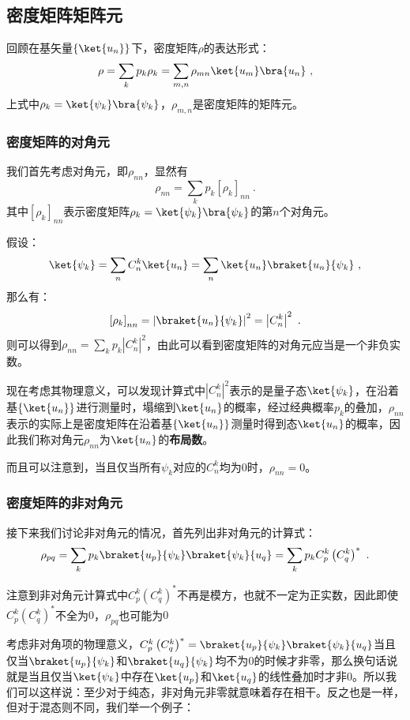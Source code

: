 \subsection{密度矩阵矩阵元}


回顾在基矢量$\left\{ \ket{u_n}\right\}$下，密度矩阵$\rho$的表达形式：
$$\rho = \sum\limits_k p_k\rho_k = \sum\limits_{m,n}\rho_{mn}\ket{u_m}\bra{u_n} ~,$$
上式中$\rho_k = \ket{\psi_k}\bra{\psi_k}$，$\rho_{m,n}$是密度矩阵的矩阵元。

\subsubsection{密度矩阵的对角元}

我们首先考虑对角元，即$\rho_{nn}$，显然有
$$\rho_{nn} = \sum\limits_{k} p_k \left[\rho_k\right]_{nn}~.$$
其中$\left[\rho_k\right]_{nn}$表示密度矩阵$\rho_k = \ket{\psi_k}\bra{\psi_k}$的第$n$个对角元。

假设：
$$\ket{\psi_k} = \sum\limits_n C_n^{k}\ket{u_n} = \sum\limits_n\ket{u_n}\braket{u_n}{\psi_k}~,$$
那么有：
$$\left[\rho_k\right]_{nn} = \left|\braket{u_n}{\psi_k}\right|^2 = \left| C_n^{k}\right|^2~.$$
则可以得到$\rho_{nn} = \sum\limits_k p_k \left|C_n^k\right|^2$，由此可以看到密度矩阵的对角元应当是一个非负实数。

现在考虑其物理意义，可以发现计算式中$\left| C_n^k \right|^2$表示的是量子态$\ket{\psi_k}$，在沿着基$\left\{\ket{u_n}\right\}$进行测量时，塌缩到$\ket{u_n}$的概率，经过经典概率$p_k$的叠加，$\rho_{nn}$表示的实际上是密度矩阵在沿着基$\left\{\ket{u_n}\right\}$测量时得到态$\ket{u_n}$的概率，因此我们称对角元$\rho_{nn}$为$\ket{u_n}$的\textbf{布局数}。

而且可以注意到，当且仅当所有$\psi_k$对应的$C_n^k$均为$0$时，$\rho_{nn} = 0$。

\subsubsection{密度矩阵的非对角元}

接下来我们讨论非对角元的情况，首先列出非对角元的计算式：
$$\rho_{pq} = \sum\limits_k p_k \braket{u_p}{\psi_k}\braket{\psi_k}{u_q} = \sum\limits_k p_k C_p^k \left(C_q^k\right)^*~.$$

注意到非对角元计算式中$C_p^k\left(C_q^k\right)^*$不再是模方，也就不一定为正实数，因此即使$C_p^k \left(C_q^k\right)^*$不全为$0$，$\rho_{pq}$也可能为$0$

考虑非对角项的物理意义，$C_p^k\left(C_q^k\right)^* = \braket{u_p}{\psi_k}\braket{\psi_k}{u_q}$当且仅当$\braket{u_p}{\psi_k}$和$\braket{u_q}{\psi_k}$均不为$0$的时候才非零，那么换句话说就是当且仅当$\ket{\psi_k}$中存在$\ket{u_p}$和$\ket{u_q}$的线性叠加时才非$0$。所以我们可以这样说：至少对于纯态，非对角元非零就意味着存在相干。反之也是一样，但对于混态则不同，我们举一个例子：

